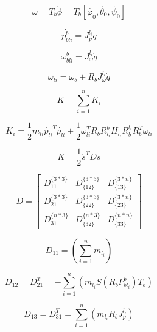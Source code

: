 \documentclass{jarticle}
\begin{document}
\begin{equation}
  \omega = T_b \dot{\phi} = T_b [\dot{\varphi_0}, \dot{\theta_0}, \dot{\psi_0}]
\end{equation}

\begin{equation}
  \dot{p_{bli}^b} = J_p^{l_i} \dot{q}
\end{equation}

\begin{equation}
  \omega_{bli}^b = J_\omega^{l_i} \dot{q}
\end{equation}

\begin{equation}
  \omega_{li} = \omega_b + R_b J_\omega^{l_i} \dot{q}
\end{equation}

\begin{equation}
  K = \sum_{i=1}^{n} K_i
\end{equation}

\begin{equation}
  K_i = \frac{1}{2} m_{li} \dot{p_{li}}^T \dot{p_{li}} + \frac{1}{2} \omega_{li}^T  R_b R_{l_i}^b H_{l_i} R_b^{l_i} R_b^T \omega_{li}
\end{equation}

\begin{equation}
  K = \frac{1}{2} \dot{s}^T D \dot{s}
\end{equation}

\begin{equation}
  D = \begin{bmatrix}
    D_{11}^{\{3*3\}} & D_{\{12\}}^{\{3*3\}} & D_{\{13\}}^{\{3*n\}}\\
    D_{21}^{\{3*3\}} & D_{\{22\}}^{\{3*3\}} & D_{\{23\}}^{\{3*n\}}\\
    D_{31}^{\{n*3\}} & D_{\{32\}}^{\{n*3\}} & D_{\{33\}}^{\{n*n\}}
  \end{bmatrix}
\end{equation}

\begin{equation}
  D_{11} = (\sum_{i=1}^{n} m_{l_i})
\end{equation}

\begin{equation}
  D_{12} = D_{21}^T = -\sum_{i=1}^{n}(m_{l_i} S(R_b P_{bl_i}^b) T_b)
\end{equation}

\begin{equation}
  D_{13} = D_{31}^T = \sum_{i=1}^{n}(m_{l_i} R_b J_p^{l_i})
\end{equation}
\end{document}
